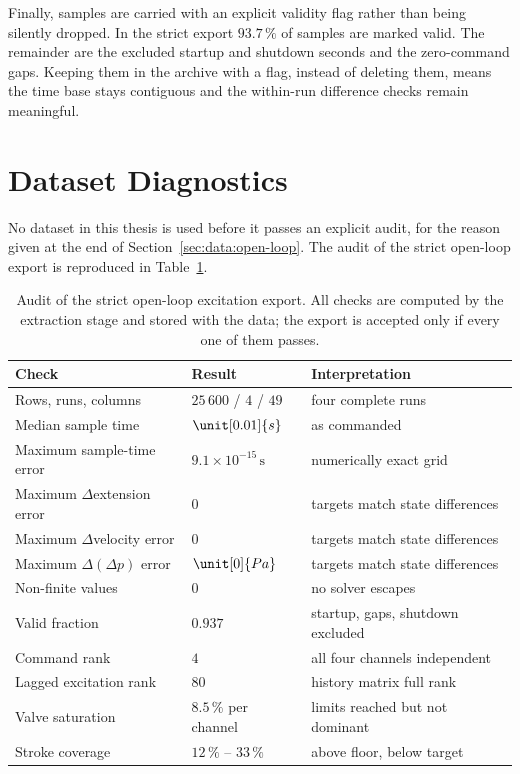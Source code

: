 Finally, samples are carried with an explicit validity flag rather than
being silently dropped. In the strict export $93.7\,\%$ of samples are
marked valid. The remainder are the excluded startup and shutdown
seconds and the zero-command gaps. Keeping them in the archive with a
flag, instead of deleting them, means the time base stays contiguous and
the within-run difference checks remain meaningful.

\section{Dataset Diagnostics}
\label{sec:data:diagnostics}

No dataset in this thesis is used before it passes an explicit audit,
for the reason given at the end of
Section~\ref{sec:data:open-loop}. The audit of the strict open-loop
export is reproduced in Table~\ref{tab:data:audit}.

\begin{table}[tb]
  \centering
  \caption{Audit of the strict open-loop excitation export. All checks
  are computed by the extraction stage and stored with the data; the
  export is accepted only if every one of them passes.}
  \label{tab:data:audit}
  \small
  \begin{tabular}{lll}
    \toprule
    Check & Result & Interpretation \\
    \midrule
    Rows, runs, columns & $25\,600$ / $4$ / $49$ & four complete runs \\
    Median sample time & $\unit[0.01]{s}$ & as commanded \\
    Maximum sample-time error & $9.1\times10^{-15}\,\mathrm{s}$ & numerically exact grid \\
    Maximum $\Delta$extension error & $0$ & targets match state differences \\
    Maximum $\Delta$velocity error & $0$ & targets match state differences \\
    Maximum $\Delta(\Delta p)$ error & $\unit[0]{Pa}$ & targets match state differences \\
    Non-finite values & $0$ & no solver escapes \\
    Valid fraction & $0.937$ & startup, gaps, shutdown excluded \\
    Command rank & $4$ & all four channels independent \\
    Lagged excitation rank & $80$ & history matrix full rank \\
    Valve saturation & $8.5\,\%$ per channel & limits reached but not dominant \\
    Stroke coverage & $12\,\%$ -- $33\,\%$ & above floor, below target \\
    \bottomrule
  \end{tabular}
\end{table}

